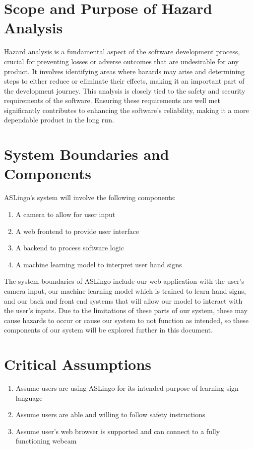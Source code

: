 \documentclass{article}
\begin{document}
\section{Scope and Purpose of Hazard Analysis}
Hazard analysis is a fundamental aspect of the software development process, crucial for preventing losses or adverse outcomes that are undesirable for any product. It involves identifying areas where hazards may arise and determining steps to either reduce or eliminate their effects, making it an important part of the development journey. This analysis is closely tied to the safety and security requirements of the software. Ensuring these requirements are well met significantly contributes to enhancing the software's reliability, making it a more dependable product in the long run.

\section{System Boundaries and Components}
ASLingo's system will involve the following components:
\begin{enumerate}
    \item A camera to allow for user input
    \item A web frontend to provide user interface
    \item A backend to process software logic
    \item A machine learning model to interpret user hand signs
\end{enumerate}

The system boundaries of ASLingo include our web application with the user's camera input, our machine learning model which is trained to learn hand signs, and our back and front end systems that will allow our model to interact with the user's inputs. Due to the limitations of these parts of our system, these may cause hazards to occur or cause our system to not function as intended, so these components of our system will be explored further in this document. 

\section{Critical Assumptions}

\begin{enumerate}
    \item Assume users are using ASLingo for its intended purpose of learning sign language
    \item Assume users are able and willing to follow safety instructions
    \item Assume user's web browser is supported and can connect to a fully functioning webcam

\end{enumerate}
\end{document}
